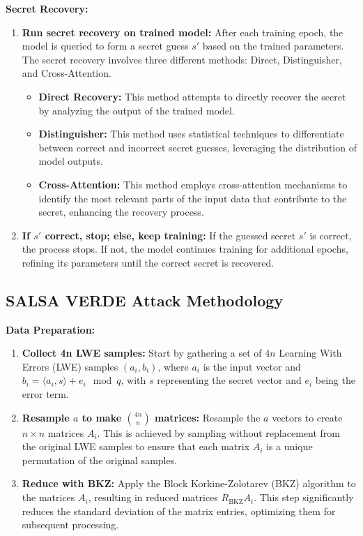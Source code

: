\documentclass{article}
\begin{document}
\textbf{Secret Recovery:}
\begin{enumerate}
    \item \textbf{Run secret recovery on trained model:} After each training epoch, the model is queried to form a secret guess \(s'\) based on the trained parameters. The secret recovery involves three different methods: Direct, Distinguisher, and Cross-Attention.
        \begin{itemize}
            \item \textbf{Direct Recovery:} This method attempts to directly recover the secret by analyzing the output of the trained model.
            \item \textbf{Distinguisher:} This method uses statistical techniques to differentiate between correct and incorrect secret guesses, leveraging the distribution of model outputs.
            \item \textbf{Cross-Attention:} This method employs cross-attention mechanisms to identify the most relevant parts of the input data that contribute to the secret, enhancing the recovery process.
        \end{itemize}
    \item \textbf{If \(s'\) correct, stop; else, keep training:} If the guessed secret \(s'\) is correct, the process stops. If not, the model continues training for additional epochs, refining its parameters until the correct secret is recovered.
\end{enumerate}

\newpage 

\subsection*{SALSA VERDE Attack Methodology}

\textbf{Data Preparation:}
\begin{enumerate}
    \item \textbf{Collect 4n LWE samples:} Start by gathering a set of \(4n\) Learning With Errors (LWE) samples \((a_i, b_i)\), where \(a_i\) is the input vector and \(b_i = \langle a_i, s \rangle + e_i \mod q\), with \(s\) representing the secret vector and \(e_i\) being the error term.
    \item \textbf{Resample \(a\) to make \(\binom{4n}{n}\) matrices:} Resample the \(a\) vectors to create \(n \times n\) matrices \(A_i\). This is achieved by sampling without replacement from the original LWE samples to ensure that each matrix \(A_i\) is a unique permutation of the original samples.
    \item \textbf{Reduce with BKZ:} Apply the Block Korkine-Zolotarev (BKZ) algorithm to the matrices \(A_i\), resulting in reduced matrices \(R_{\text{BKZ}}A_i\). This step significantly reduces the standard deviation of the matrix entries, optimizing them for subsequent processing.
\end{enumerate}
\end{document}
